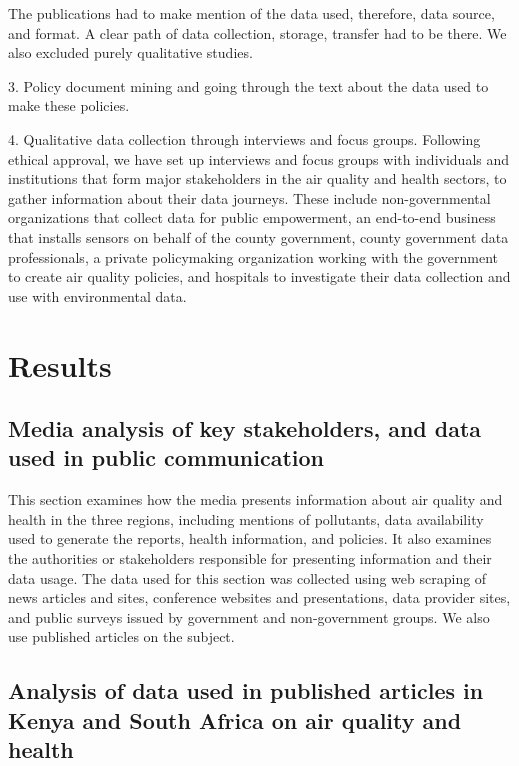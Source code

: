 \documentclass{article}
\begin{document}
The publications had to make mention of the data used, therefore, data source, and format. A clear path of data collection, storage, transfer had to be there. 
We also excluded purely qualitative studies.

3. Policy document mining and going through the text about the data used to make these policies.


4. Qualitative data collection through interviews and focus groups. Following ethical approval, we have set up interviews and focus groups with individuals and institutions that form major stakeholders in the air quality and health sectors, to gather information about their data journeys. These include non-governmental organizations that collect data for public empowerment, an end-to-end business that installs sensors on behalf of the county government, county government data professionals, a private policymaking organization working with the government to create air quality policies, and hospitals to investigate their data collection and use with environmental data. 

\section{Results}

\subsection{Media analysis of key stakeholders, and data used in public communication}

This section examines how the media presents information about air quality and health in the three regions, including mentions of pollutants, data availability used to generate the reports, health information, and policies. It also examines the authorities or stakeholders responsible for presenting information and their data usage. 
The data used for this section was collected using web scraping of news articles and sites, conference websites and presentations, data provider sites, and public surveys issued by government and non-government groups. We also use published articles on the subject. 



\subsection{Analysis of data used in published articles in Kenya and South Africa on air quality and health} 
\end{document}
